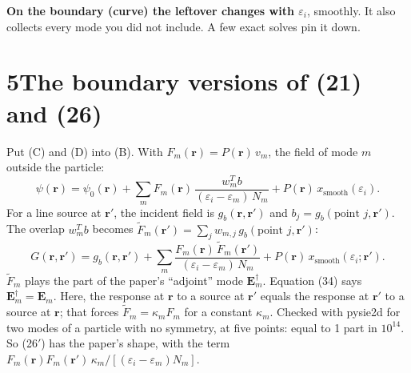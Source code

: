 \documentclass[11pt]{article}
\newcommand{\vb}[1]{\boldsymbol{#1}}
\newcommand{\eps}{\varepsilon}
\begin{document}
\textbf{On the boundary (curve) the leftover changes with $\eps_i$}, smoothly. It also collects every mode you did not include. A few exact solves pin it down.

\section*{5\quad The boundary versions of (21) and (26)}

Put (C) and (D) into (B). With $F_m(\vb r)=P(\vb r)\,v_m$, the field of mode $m$ outside the particle:
\begin{equation}
\psi(\vb r)=\psi_0(\vb r)+\sum_m F_m(\vb r)\,\frac{w_m^T b}{(\eps_i-\eps_m)\,N_m}+P(\vb r)\,x_{\text{smooth}}(\eps_i).
\tag{21$'$}
\end{equation}
For a line source at $\vb r'$, the incident field is $g_b(\vb r,\vb r')$ and $b_j=g_b(\text{point } j,\vb r')$. The overlap $w_m^Tb$ becomes $\tilde F_m(\vb r')=\sum_j w_{m,j}\,g_b(\text{point } j,\vb r')$:
\begin{equation}
G(\vb r,\vb r')=g_b(\vb r,\vb r')+\sum_m \frac{F_m(\vb r)\,\tilde F_m(\vb r')}{(\eps_i-\eps_m)\,N_m}+P(\vb r)\,x_{\text{smooth}}(\eps_i;\vb r').
\tag{26$'$}
\end{equation}
$\tilde F_m$ plays the part of the paper's ``adjoint'' mode $\vb E^\dagger_m$. Equation (34) says $\vb E^\dagger_m=\vb E_m$. Here, the response at $\vb r$ to a source at $\vb r'$ equals the response at $\vb r'$ to a source at $\vb r$; that forces $\tilde F_m=\kappa_m F_m$ for a constant $\kappa_m$. Checked with pysie2d for two modes of a particle with no symmetry, at five points: equal to 1 part in $10^{14}$. So (26$'$) has the paper's shape, with the term $F_m(\vb r)F_m(\vb r')\,\kappa_m/[(\eps_i-\eps_m)N_m]$.
\end{document}
